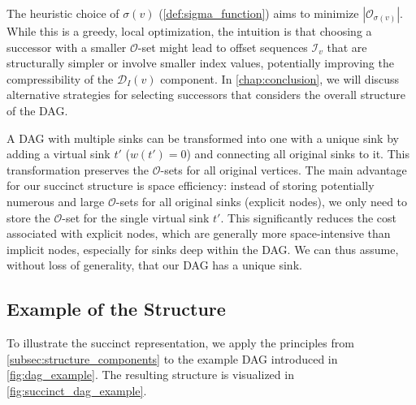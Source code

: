 The heuristic choice of $\sigma(v)$ (\ref{def:sigma_function}) aims to minimize $|\mathcal{O}_{\sigma(v)}|$. While this is a greedy, local optimization, the intuition is that choosing a successor with a smaller $\mathcal{O}$-set might lead to offset sequences $\mathcal{I}_v$ that are structurally simpler or involve smaller index values, potentially improving the compressibility of the $\mathcal{D}_I(v)$ component. In \autoref{chap:conclusion}, we will discuss alternative strategies for selecting successors that considers the overall structure of the DAG.

\begin{remark}
    A DAG with multiple sinks can be transformed into one with a unique sink by adding a virtual sink $t'$ ($w(t')=0$) and connecting all original sinks to it. This transformation preserves the $\mathcal{O}$-sets for all original vertices. The main advantage for our succinct structure is space efficiency: instead of storing potentially numerous and large $\mathcal{O}$-sets for all original sinks (explicit nodes), we only need to store the $\mathcal{O}$-set for the single virtual sink $t'$. This significantly reduces the cost associated with explicit nodes, which are generally more space-intensive than implicit nodes, especially for sinks deep within the DAG. We can thus assume, without loss of generality, that our DAG has a unique sink.
\end{remark}


\subsection*{Example of the Structure}
\label{subsec:structure_example}
To illustrate the succinct representation, we apply the principles from \autoref{subsec:structure_components} to the example DAG introduced in \autoref{fig:dag_example}. The resulting structure is visualized in \autoref{fig:succinct_dag_example}.

